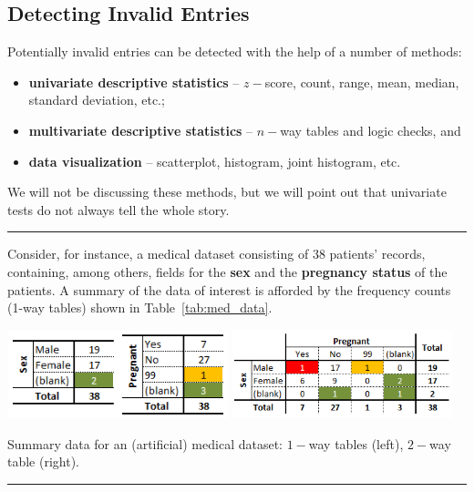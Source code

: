 \subsection{Detecting Invalid Entries}
Potentially invalid entries can be detected with the help of a number of methods: 
\begin{itemize}[noitemsep]
    \item \textbf{univariate descriptive statistics} -- $z-$score, count, range, mean, median, standard deviation, etc.;
    \item \textbf{multivariate descriptive statistics} -- $n-$way tables and logic checks, and \item \textbf{data visualization} -- scatterplot, histogram, joint histogram, etc.
\end{itemize} 
We will not be discussing these methods, but we will point out that univariate tests do not always tell the whole story. 
\begin{center}
    \rule{0.5\linewidth}{.4pt}
\end{center}
Consider, for instance, a medical dataset consisting of 38 patients' records, containing, among others, fields for the \textbf{sex} and the \textbf{pregnancy status} of the patients. A summary of the data of interest is afforded by the frequency counts (1-way tables) shown in Table~\ref{tab:med_data}.
\begin{table}[t]
       \centering
 \includegraphics[width=0.48\textwidth]{Images/med_sex_preg}\quad
\includegraphics[width=0.48\textwidth]{Images/med_2_way}
\caption{\small Summary data for an (artificial) medical dataset: $1-$way tables (left), $2-$way table (right).}\hrule
        \label{tab:med_data}
\end{table}
\newpage\noindent 
